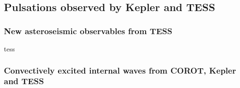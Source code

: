 {\color{blue}
\subsection{Pulsations observed by Kepler and TESS}



\subsubsection{New asteroseismic observables from TESS}

tess 

\subsubsection{Convectively excited internal waves from COROT, Kepler and TESS}


}